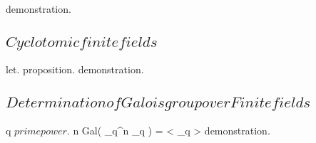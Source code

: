 \documentclass[a5paper]{book}
\begin{document}
{{		
	}
	\demonstration
	{
		demonstration.
	}
	\newpage


	\subsection{ $ Cyclotomic finite fields $ }
	
	{
		let.
	}
	\proposition
	{
		proposition.
	}
	\demonstration
	{
		demonstration.
	}
	\newpage


	\subsection{ $ Determination of Galois group over Finite fields $ }
	
	{
		q \in \N $ prime power $.
		n \in \N
	}
	\proposition
	{
		Gal( \F_{q^n} \extends \F_q ) = < \phin_q >
	}
	\demonstration
	{
		demonstration.
	}
	\newpage
}















\end{document}
